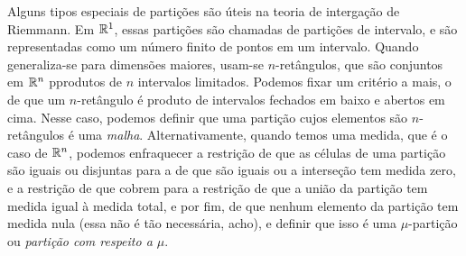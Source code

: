 Alguns tipos especiais de partições são úteis na teoria de intergação de Riemmann. Em $\mathbb{R}^1$, essas partições são chamadas de partições de intervalo, e são representadas como um número finito de pontos em um intervalo. Quando generaliza-se para dimensões maiores, usam-se $n$-retângulos, que são conjuntos em $\mathbb{R}^n$ pprodutos de $n$ intervalos limitados. Podemos fixar um critério a mais, o de que um $n$-retângulo é produto de intervalos fechados em baixo e abertos em cima. Nesse caso, podemos definir que uma partição cujos elementos são $n$-retângulos é uma \emph{malha}. Alternativamente, quando temos uma medida, que é o caso de $\mathbb{R}^n$, podemos enfraquecer a restrição de que as células de uma partição são iguais ou disjuntas para a de que são iguais ou a interseção tem medida zero, e a restrição de que cobrem para a restrição de que a união da partição tem medida igual à medida total, e por fim, de que nenhum elemento da partição tem medida nula (essa não é tão necessária, acho), e definir que isso é uma $\mu$-partição ou \emph{partição com respeito a $\mu$}.











